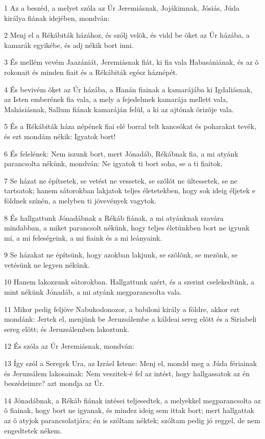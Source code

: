 \par 1 Az a beszéd, a melyet szóla az Úr Jeremiásnak, Jojákimnak, Jósiás, Júda királya fiának idejében, mondván:
\par 2 Menj el a Rékábiták házához, és szólj velök, és vidd be õket az Úr házába, a kamarák egyikébe, és adj nékik bort inni.
\par 3 És mellém vevém Jaazániát, Jeremiásnak fiát, ki fia vala Habasániának, és az õ rokonait és minden fiait és a Rékábiták egész háznépét.
\par 4 És bevivém õket az Úr házába, a Hanán fiainak a kamarájába ki Igdaliásnak, az Isten emberének fia vala, a mely a fejedelmek kamarája mellett vala, Mahásiásnak, Sallum fiának kamaráján felül, a ki az ajtónak õrizõje vala.
\par 5 És a Rékábiták háza népének fiai elé borral telt kancsókat és poharakat tevék, és ezt mondám nékik: Igyatok bort!
\par 6 És felelének: Nem iszunk bort, mert Jónadáb, Rékábnak fia, a mi atyánk parancsolta nékünk, mondván: Ne igyatok ti bort soha, se a ti fiaitok.
\par 7 Se házat ne építsetek, se vetést ne vessetek, se szõlõt ne ültessetek, se ne tartsatok; hanem sátorokban lakjatok teljes életetekben, hogy sok ideig éljetek e földnek színén, a melyben ti jövevények vagytok.
\par 8 És hallgattunk Jónadábnak a Rékáb fiának, a mi atyánknak szavára mindabban, a miket parancsolt nékünk, hogy teljes életünkben bort ne igyunk mi, a mi feleségeink, a mi fiaink és a mi leányaink.
\par 9 Se házakat ne építsünk, hogy azokban lakjunk, se szõlõnk, se mezõnk, se vetésünk ne legyen nékünk.
\par 10 Hanem lakozzunk sátorokban. Hallgattunk azért, és a szerint cselekedtünk, a mint nékünk Jónadáb, a mi atyánk megparancsolta vala.
\par 11 Mikor pedig feljöve Nabukodonozor, a babiloni király a földre, akkor ezt mondánk: Jertek el, menjünk be Jeruzsálembe a káldeai sereg elõtt és a Siriabeli sereg elõtt; és Jeruzsálemben lakoztunk.
\par 12 És szóla az Úr Jeremiásnak, mondván:
\par 13 Így szól a Seregek Ura, az Izráel Istene: Menj el, mondd meg a Júda fériainak és Jeruzsálem lakosainak: Nem veszitek-é fel az intést, hogy hallgassatok az én beszédeimre? azt mondja az Úr.
\par 14 Jónadábnak, a Rékáb fiának intései teljesedtek, a melyekkel megparancsolta az õ fiainak, hogy bort ne igyanak, és mindez ideig sem ittak bort; mert hallgattak az õ atyjok parancsolatjára; én is szóltam néktek; szóltam pedig jó reggel, de nem engedtetek nékem.
